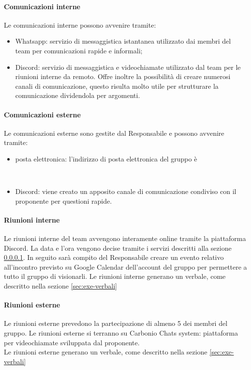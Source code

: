    \paragraph{Comunicazioni interne} \label{sec:com-interne}
    Le comunicazioni interne possono avvenire tramite:
        \begin{itemize}
            \item Whatsapp: servizio di messaggistica istantanea utilizzato dai membri del team per comunicazioni rapide e informali;
            \item Discord: servizio di messaggistica e videochiamate utilizzato dal team per le riunioni interne da remoto. Offre inoltre la possibilità di creare numerosi canali di comunicazione, questo risulta molto utile per strutturare la comunicazione dividendola per argomenti.  
        \end{itemize}

    \paragraph{Comunicazioni esterne}
    Le comunicazioni esterne sono gestite dal Responsabile e possono avvenire tramite:
    \begin{itemize}
        \item posta elettronica: l'indirizzo di posta elettronica del gruppo è
        \begin{center}
            \mailtoQBS\\[0.3cm]
        \end{center} 
        \item Discord: viene creato un apposito canale di comunicazione condiviso con il proponente per questioni rapide.
    \end{itemize}

    \paragraph{Riunioni interne}
    Le riunioni interne del team avvengono interamente online tramite la piattaforma Discord. La data e l'ora vengono decise tramite i servizi descritti alla sezione \ref{sec:com-interne}. In seguito sarà compito del Responsabile creare un evento relativo all'incontro previsto su Google Calendar dell'account del gruppo per permettere a tutto il gruppo di visionarli.
    Le riunioni interne generano un verbale, come descritto nella sezione \ref{sec:exe-verbali}

    \paragraph{Riunioni esterne}
    Le riunioni esterne prevedono la partecipazione di almeno 5 dei membri del gruppo. Le riunioni esterne si terranno su Carbonio Chats system: piattaforma per videochiamate sviluppata dal proponente.\\
    Le riunioni esterne generano un verbale, come descritto nella sezione \ref{sec:exe-verbali}

